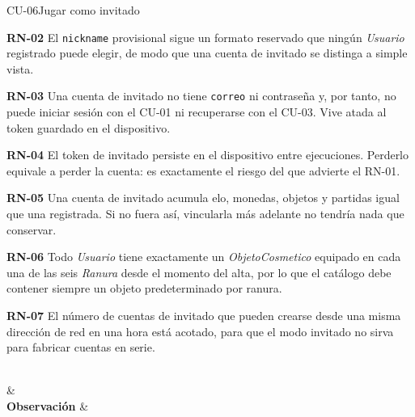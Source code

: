 \begin{fichacu}{CU-06}{Jugar como invitado}
{\begin{cureglas}
      \item \textbf{\mbox{RN-02}} El \texttt{nickname} provisional sigue un formato reservado que ningún \textit{Usuario} registrado puede elegir, de modo que una cuenta de invitado se distinga a simple vista.
      \item \textbf{\mbox{RN-03}} Una cuenta de invitado no tiene \texttt{correo} ni contraseña y, por tanto, no puede iniciar sesión con el \mbox{CU-01} ni recuperarse con el \mbox{CU-03}. Vive atada al token guardado en el dispositivo.
      \item \textbf{\mbox{RN-04}} El token de invitado persiste en el dispositivo entre ejecuciones. Perderlo equivale a perder la cuenta: es exactamente el riesgo del que advierte el \mbox{RN-01}.
      \item \textbf{\mbox{RN-05}} Una cuenta de invitado acumula elo, monedas, objetos y partidas igual que una registrada. Si no fuera así, vincularla más adelante no tendría nada que conservar.
      \item \textbf{\mbox{RN-06}} Todo \textit{Usuario} tiene exactamente un \textit{ObjetoCosmetico} equipado en cada una de las seis \textit{Ranura} desde el momento del alta, por lo que el catálogo debe contener siempre un objeto predeterminado por ranura.
      \item \textbf{\mbox{RN-07}} El número de cuentas de invitado que pueden crearse desde una misma dirección de red en una hora está acotado, para que el modo invitado no sirva para fabricar cuentas en serie.
    \end{cureglas}} \\
   &  \\ \hline
  \textbf{Observación} & 
\end{fichacu}
